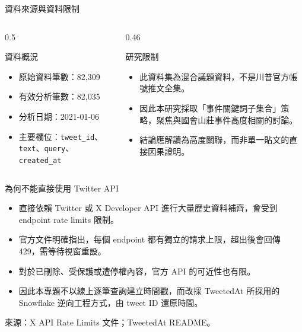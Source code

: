 \documentclass[aspectratio=169]{ctexbeamer}
\begin{document}
\begin{frame}{資料來源與資料限制}
\begin{columns}[T]
  \begin{column}{0.5\textwidth}
    \begin{block}{資料概況}
    \begin{itemize}
      \item 原始資料筆數：82,309
      \item 有效分析筆數：82,035
      \item 分析日期：2021-01-06
      \item 主要欄位：\texttt{tweet\_id}、\texttt{text}、\texttt{query}、\texttt{created\_at}
    \end{itemize}
    \end{block}
  \end{column}
  \begin{column}{0.46\textwidth}
    \begin{block}{研究限制}
    \begin{itemize}
      \item 此資料集為混合議題資料，不是川普官方帳號推文全集。
      \item 因此本研究採取「事件關鍵詞子集合」策略，聚焦與國會山莊事件高度相關的討論。
      \item 結論應解讀為高度關聯，而非單一貼文的直接因果證明。
    \end{itemize}
    \end{block}
  \end{column}
\end{columns}
\end{frame}

\begin{frame}{為何不能直接使用 Twitter API}
\begin{itemize}
  \item 直接依賴 Twitter 或 X Developer API 進行大量歷史資料補齊，會受到 endpoint rate limits 限制。
  \item 官方文件明確指出，每個 endpoint 都有獨立的請求上限，超出後會回傳 429，需等待視窗重設。
  \item 對於已刪除、受保護或遭停權內容，官方 API 的可近性也有限。
  \item 因此本專題不以線上逐筆查詢建立時間戳，而改採 TweetedAt 所採用的 Snowflake 逆向工程方式，由 tweet ID 還原時間。
\end{itemize}

\vspace{0.5em}
\tiny 來源：X API Rate Limits 文件；TweetedAt README。
\end{frame}
\end{document}
